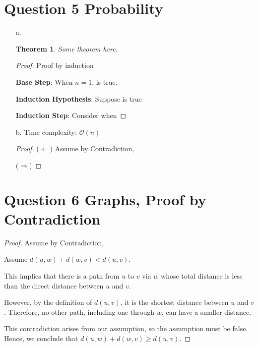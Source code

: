 \documentclass[11pt,fleqn]{article}
\newcommand{\bigO}{\ensuremath{\mathcal{O}}}
\newcommand{\Base}{\textbf{Base Step}: }
\newcommand{\IH}{\textbf{Induction Hypothesis}: }
\newcommand{\IS}{\textbf{Induction Step}: }
\newtheorem*{theorem}{Theorem}
\theoremstyle{definition}
\theoremstyle{remark}
\begin{document}
\section{Question 5 Probability}
\begin{enumerate}
    \item[a.]
    \begin{theorem}
        Some theorem here.
    \end{theorem}
    \begin{proof} Proof by induction
    
    \Base {When $n=1$, is true.}
    
    \IH {Suppose is true}
    
    \IS Consider when 
    \end{proof}
    
    \item[b.]
    Time complexity: $\bigO (n)$
    \begin{proof}
    ($\Leftarrow$) Assume by Contradiction,
    
    ($\Rightarrow$)
    \end{proof}
    
\end{enumerate}
\newpage
\clearpage

\section{Question 6 Graphs, Proof by Contradiction}
 
    \begin{proof}
        Assume by Contradiction,
        
        Assume \( d(u,w) + d(w,v) < d(u,v) \).
        
        This implies that there is a path from \( u \) to \( v \) via \( w \) whose total distance is less than the direct distance between \( u \) and \( v \).

        However, by the definition of \( d(u,v) \), it is the shortest distance between \( u \) and \( v \). Therefore, no other path, including one through \( w \), can have a smaller distance.

        This contradiction arises from our assumption, so the assumption must be false. Hence, we conclude that \( d(u,w) + d(w,v) \geq d(u,v) \).
    \end{proof}
        
    

\newpage
\clearpage
\end{document}
